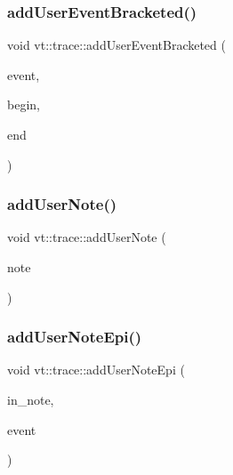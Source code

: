 \subsubsection{\texorpdfstring{add\+User\+Event\+Bracketed()}{addUserEventBracketed()}}
{\footnotesize\ttfamily void vt\+::trace\+::add\+User\+Event\+Bracketed (\begin{DoxyParamCaption}\item[{\hyperlink{namespacevt_1_1trace_a5908920d051c144c89f17c69ed262350}{User\+Event\+I\+D\+Type}}]{event,  }\item[{double}]{begin,  }\item[{double}]{end }\end{DoxyParamCaption})}

\mbox{\label{namespacevt_1_1trace_a40f3744bfeb2281ce300d12271f3d48c}} 
\subsubsection{\texorpdfstring{add\+User\+Note()}{addUserNote()}}
{\footnotesize\ttfamily void vt\+::trace\+::add\+User\+Note (\begin{DoxyParamCaption}\item[{std\+::string const \&}]{note }\end{DoxyParamCaption})}

\mbox{\label{namespacevt_1_1trace_a88ba644209a56fabce33c4ff1a8e53ee}} 
\subsubsection{\texorpdfstring{add\+User\+Note\+Epi()}{addUserNoteEpi()}}
{\footnotesize\ttfamily void vt\+::trace\+::add\+User\+Note\+Epi (\begin{DoxyParamCaption}\item[{std\+::string const \&}]{in\+\_\+note,  }\item[{\hyperlink{namespacevt_1_1trace_a64a7185f3e102df8d8258f263ccd1582}{Trace\+Event\+I\+D\+Type} const}]{event }\end{DoxyParamCaption})}

\mbox{\label{namespacevt_1_1trace_aee0bc5a9765f7cb09fc59aa9d5a57390}} 
